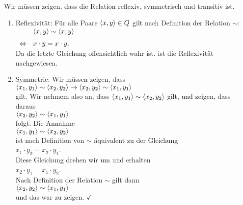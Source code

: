 \proof
Wir müssen zeigen, dass die Relation reflexiv, symmetrisch und transitiv ist.
\begin{enumerate}
\item Reflexivität: Für alle Paare $\pair(x,y) \in Q$ gilt nach Definition der Relation $\sim$:
      \\[0.2cm]
      \hspace*{1.3cm}
      $
      \begin{array}[t]{cll}
                      & \pair(x,y) \sim \pair(x,y) \\[0.2cm]
      \Leftrightarrow & x \cdot y = x \cdot y.
      \end{array}
      $
      \\[0.2cm]
      Da die letzte Gleichung offensichtlich wahr ist, ist die Reflexivität nachgewiesen. \checkmark
\item Symmetrie: Wir müssen zeigen, dass
      \\[0.2cm]
      \hspace*{1.3cm}
      $\pair(x_1, y_1) \sim \pair(x_2, y_2) \rightarrow \pair(x_2, y_2) \sim \pair(x_1, y_1)$
      \\[0.2cm]
      gilt.  Wir nehmem also an, dass $\pair(x_1, y_1) \sim \pair(x_2, y_2)$ gilt, und zeigen, dass 
      daraus 
      \\[0.2cm]
      \hspace*{1.3cm}
      $\pair(x_2, y_2) \sim \pair(x_1, y_1)$ 
      \\[0.2cm]
      folgt.  Die Annahme 
      \\[0.2cm]
      \hspace*{1.3cm}
      $\pair(x_1, y_1) \sim \pair(x_2, y_2)$
      \\[0.2cm]
      ist nach Definition von $\sim$ äquivalent zu der Gleichung
      \\[0.2cm]
      \hspace*{1.3cm}
      $x_1 \cdot y_2 = x_2 \cdot y_1$.
      \\[0.2cm]
      Diese Gleichung drehen wir um und erhalten
      \\[0.2cm]
      \hspace*{1.3cm}
      $x_2 \cdot y_1 = x_1 \cdot y_2$.
      \\[0.2cm]
      Nach Definition der Relation $\sim$ gilt dann
      \\[0.2cm]
      \hspace*{1.3cm}
      $\pair(x_2, y_2) \sim \pair(x_1, y_1)$
      \\[0.2cm]
      und das war zu zeigen. $\checkmark$

\end{enumerate}
